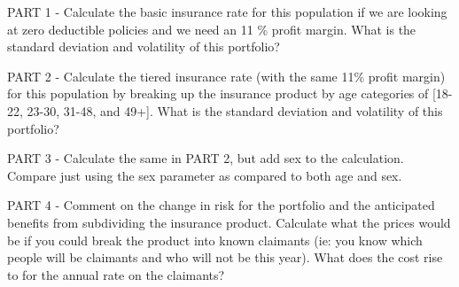 \documentclass[12pt]{exam}
\begin{document}
\begin{questions}
PART 1 - Calculate the basic insurance rate for this population if we are looking at zero deductible policies and we need an 11 \% profit margin. What is the standard deviation and volatility of this portfolio?

PART 2 - Calculate the tiered insurance rate (with the same 11\% profit margin) for this population by breaking up the insurance product by age categories of [18-22, 23-30, 31-48, and 49+]. What is the standard deviation and volatility of this portfolio?

PART 3 - Calculate the same in PART 2, but add sex to the calculation. Compare just using the sex parameter as compared to both age and sex. 

PART 4 - Comment on the change in risk for the portfolio and the anticipated benefits from subdividing the insurance product. Calculate what the prices would be if you could break the product into known claimants (ie: you know which people will be claimants and who will not be this year). What does the cost rise to for the annual rate on the claimants? 







\end{questions}
\end{document}
